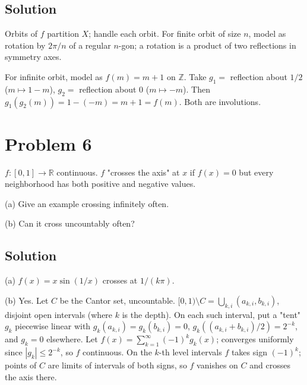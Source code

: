 \documentclass{article}
\begin{document}
\subsection*{Solution}
Orbits of $f$ partition $X$; handle each orbit. For finite orbit of size $n$, model as rotation by $2\pi/n$ of a regular $n$-gon; a rotation is a product of two reflections in symmetry axes.

For infinite orbit, model as $f(m)=m+1$ on $\mathbb{Z}$. Take $g_1 = $ reflection about $1/2$ ($m\mapsto 1-m$), $g_2 = $ reflection about $0$ ($m\mapsto -m$). Then $g_1(g_2(m)) = 1-(-m) = m+1 = f(m)$. Both are involutions.

\section*{Problem 6}
$f:[0,1]\to\mathbb{R}$ continuous. $f$ "crosses the axis" at $x$ if $f(x)=0$ but every neighborhood has both positive and negative values.

(a) Give an example crossing infinitely often.

(b) Can it cross uncountably often?

\subsection*{Solution}
(a) $f(x)=x\sin(1/x)$ crosses at $1/(k\pi)$.

(b) Yes. Let $C$ be the Cantor set, uncountable. $[0,1)\setminus C = \bigcup_{k,i}(a_{k,i}, b_{k,i})$, disjoint open intervals (where $k$ is the depth). On each such interval, put a "tent" $g_k$ piecewise linear with $g_k(a_{k,i})=g_k(b_{k,i})=0$, $g_k((a_{k,i}+b_{k,i})/2) = 2^{-k}$, and $g_k=0$ elsewhere. Let $f(x) = \sum_{k=1}^\infty (-1)^k g_k(x)$; converges uniformly since $|g_k|\le 2^{-k}$, so $f$ continuous. On the $k$-th level intervals $f$ takes sign $(-1)^k$; points of $C$ are limits of intervals of both signs, so $f$ vanishes on $C$ and crosses the axis there.
\end{document}
